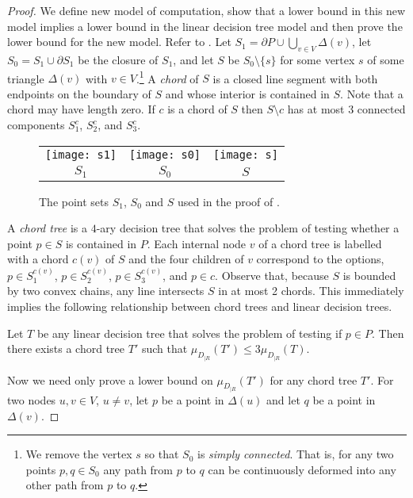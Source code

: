 \documentclass[charterfonts,lotsofwhite]{patmorin}
\newcommand{\boundary}{\partial}
\begin{document}
\begin{proof}

We define new model of computation, show that a lower bound in this
new model implies a lower bound in the linear decision tree model and
then prove the lower bound for the new model.  Refer to .  Let $S_1= \boundary P
\cup \bigcup_{v\in V} \Delta(v)$, let $S_0=S_1\cup\boundary S_1$ be
the closure of $S_1$, and let $S$ be $S_0\setminus\{s\}$ for some vertex
$s$ of some triangle $\Delta(v)$ with $v\in V$.\footnote{We remove the
vertex $s$ so that $S_0$ is \emph{simply connected}.  That is, for any
two points $p,q\in S_0$ any path from $p$ to $q$ can be continuously
deformed into any other path from $p$ to $q$.} A \emph{chord} of $S$
is a closed line segment with both endpoints on the boundary of $S$
and whose interior is contained in $S$. Note that a chord may have
length zero.  If $c$ is a chord of $S$ then $S\setminus c$ has at most
3 connected components $S^c_1$, $S^c_2$, and $S^c_3$.

\begin{figure}
\begin{center}
\begin{tabular}{ccc}
\texttt{[image: s1]} &
\texttt{[image: s0]} &
\texttt{[image: s]} \\
$S_1$ & $S_0$ & $S$ 
\end{tabular}
\end{center}
\caption{The point sets $S_1$, $S_0$ and $S$ used in the proof of
.}
\end{figure}

A \emph{chord tree} is a $4$-ary decision tree that solves the problem
of testing whether a point $p\in S$ is contained in $P$.  Each
internal node $v$ of a chord tree is labelled with a chord $c(v)$ of
$S$ and the four children of $v$ correspond to the options,
$p\in S^{c(v)}_1$, $p\in S^{c(v)}_2$, $p\in S^{c(v)}_3$, and $p\in c$.
Observe that, because $S$ is bounded by two convex chains, any line
intersects $S$ in at most 2 chords.  This immediately implies the
following relationship between chord trees and linear decision trees.
\begin{clm}
Let $T$ be any linear decision tree that solves the problem of testing
if $p\in P$.  Then there exists a chord tree $T'$ such that 
$\mu_{D_{|R}}(T') \le 3\mu_{D_{|R}}(T)$.
\end{clm}

Now we need only prove a lower bound on $\mu_{D_{|R}}(T')$ for any
chord tree $T'$.  For two nodes $u,v\in V$, $u\neq v$, let $p$ be a
point in $\Delta(u)$ and let $q$ be a point in $\Delta(v)$.  


\end{proof}
\end{document}

